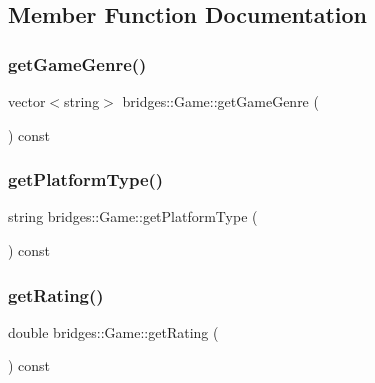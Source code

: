 \subsection{Member Function Documentation}
\mbox{\label{classbridges_1_1_game_a2c335f413572a74d3e645c42ba6ec57a}} 
\subsubsection{\texorpdfstring{getGameGenre()}{getGameGenre()}}
{\footnotesize\ttfamily vector$<$string$>$ bridges\+::\+Game\+::get\+Game\+Genre (\begin{DoxyParamCaption}{ }\end{DoxyParamCaption}) const\hspace{0.3cm}{\ttfamily [inline]}}

\mbox{\label{classbridges_1_1_game_a450395f308c0f5fec1bfd83295630493}} 
\subsubsection{\texorpdfstring{getPlatformType()}{getPlatformType()}}
{\footnotesize\ttfamily string bridges\+::\+Game\+::get\+Platform\+Type (\begin{DoxyParamCaption}{ }\end{DoxyParamCaption}) const\hspace{0.3cm}{\ttfamily [inline]}}

\mbox{\label{classbridges_1_1_game_ac4034068074e006ac6c1fddca6a63791}} 
\subsubsection{\texorpdfstring{getRating()}{getRating()}}
{\footnotesize\ttfamily double bridges\+::\+Game\+::get\+Rating (\begin{DoxyParamCaption}{ }\end{DoxyParamCaption}) const\hspace{0.3cm}{\ttfamily [inline]}}

